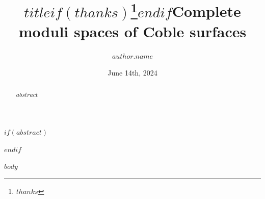 \documentclass{amsart}
\title{$title$$if(thanks)$\thanks{$thanks$}$endif$}
\title{Complete moduli spaces of Coble surfaces}
\date{June 14th, 2024}
\author{$author.name$}
\begin{document}
$if(abstract)$
\begin{abstract}
    $abstract$
\end{abstract}
$endif$

\maketitle
\tableofcontents

\newpage

$body$

\clearpage
 \printbibliography
\end{document}
